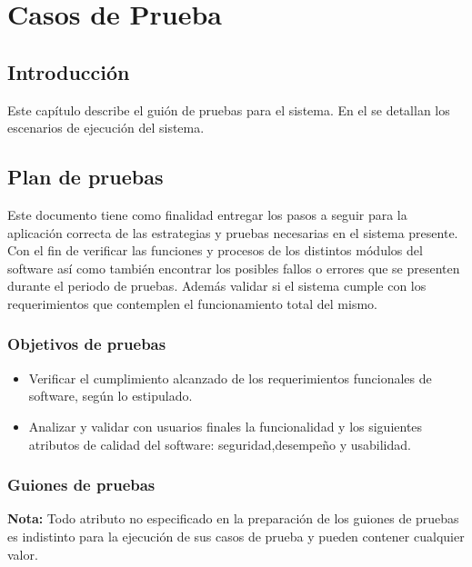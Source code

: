 \chapter{Casos de Prueba}
\label{cap:CasosDePrueba}
\section{Introducción}
Este capítulo describe el guión de pruebas para el sistema. En el se detallan los escenarios de ejecución del sistema.
\section{Plan de pruebas}
Este documento tiene como finalidad entregar los pasos a seguir para la aplicación correcta de las estrategias y pruebas necesarias en el sistema presente. Con el fin de verificar las funciones y procesos de los distintos módulos del software así como también encontrar los posibles fallos o errores que se presenten durante el periodo de pruebas.
Además validar si el sistema cumple con los requerimientos que contemplen el funcionamiento total del mismo.
\subsection{Objetivos de pruebas}
\begin{itemize}
    \item Verificar el cumplimiento alcanzado de los requerimientos funcionales de software, según lo estipulado.
    \item Analizar y validar con usuarios finales la funcionalidad y los siguientes atributos de calidad del software: seguridad,desempeño y usabilidad.
\end{itemize}
\subsection{Guiones de pruebas}
\textbf{Nota:} Todo atributo no especificado en la preparación de los guiones de pruebas es indistinto para la ejecución de sus casos de prueba y pueden contener cualquier valor.
\clearpage
